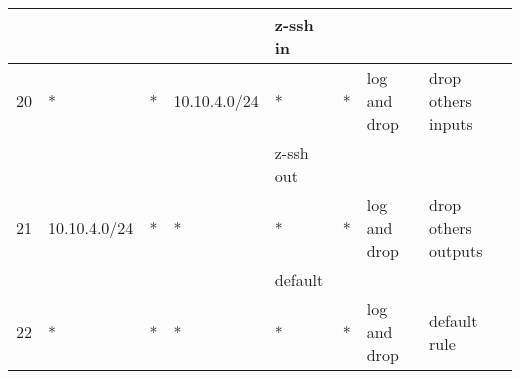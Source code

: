 \documentclass[a4paper, 11pt, oneside]{article}
\begin{document}
\begin{table}[H]
\begin{tabular}{|llllllll|}
                                    &                                      &                                  &                                           & {\color[HTML]{FE0000} z-ssh in}  &                                        &                                      &                     \\ \hline
  \multicolumn{1}{|l|}{20}          & \multicolumn{1}{l|}{*}               & \multicolumn{1}{l|}{*}           & \multicolumn{1}{l|}{10.10.4.0/24}         & \multicolumn{1}{l|}{*}           & \multicolumn{1}{l|}{*}                 & \multicolumn{1}{l|}{log and drop}            & drop others inputs  \\ \hline
                                    &                                      &                                  &                                           & {\color[HTML]{FE0000} z-ssh out} &                                        &                                      &                     \\ \hline
  \multicolumn{1}{|l|}{21}          & \multicolumn{1}{l|}{10.10.4.0/24}    & \multicolumn{1}{l|}{*}           & \multicolumn{1}{l|}{*}                    & \multicolumn{1}{l|}{*}           & \multicolumn{1}{l|}{*}                 & \multicolumn{1}{l|}{log and drop}            & drop others outputs \\ \hline
                                    &                                      &                                  &                                           & {\color[HTML]{FE0000} default}   &                                        &                                      &                     \\ \hline
  \multicolumn{1}{|l|}{22}          & \multicolumn{1}{l|}{*}               & \multicolumn{1}{l|}{*}           & \multicolumn{1}{l|}{*}                    & \multicolumn{1}{l|}{*}           & \multicolumn{1}{l|}{*}                 & \multicolumn{1}{l|}{log and drop}    & default rule        \\ \hline
  
  \end{tabular}
\end{table}

\end{document}
